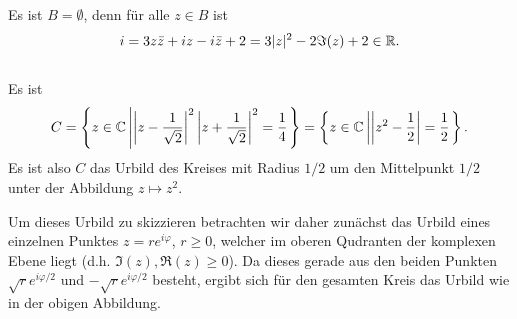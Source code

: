 \documentclass[a4paper,10pt]{article}
\begin{document}
\begin{center}
\end{center}


\subsection{}
Es ist $B = \emptyset$, denn für alle $z \in B$ ist
\[
 i = 3z\bar{z}+iz-i\bar{z}+2 = 3|z|^2 -2\Im(z) +2 \in \mathbb{R}.
\]


\subsection{}
Es ist
\[
 C
 = \left\{z \in \mathbb{C} \left| \left|z-\frac{1}{\sqrt{2}}\right|^2 \left|z+\frac{1}{\sqrt{2}}\right|^2 = \frac{1}{4} \right.\right\}
 = \left\{z \in \mathbb{C} \left| \left|z^2-\frac{1}{2}\right| = \frac{1}{2} \right.\right\}.
\]
Es ist also $C$ das Urbild des Kreises mit Radius $1/2$ um den Mittelpunkt $1/2$ unter der Abbildung $z \mapsto z^2$.

Um dieses Urbild zu skizzieren betrachten wir daher zunächst das Urbild eines einzelnen Punktes $z = r e^{i\varphi}$, $r \geq 0$, welcher im oberen Qudranten der komplexen Ebene liegt (d.h. $\Im(z), \Re(z) \geq 0$). Da dieses gerade aus den beiden Punkten $\sqrt{r} e^{i\varphi/2}$ und $-\sqrt{r}e^{i\varphi/2}$ besteht, ergibt sich für den gesamten Kreis das Urbild wie in der obigen Abbildung.
\end{document}
